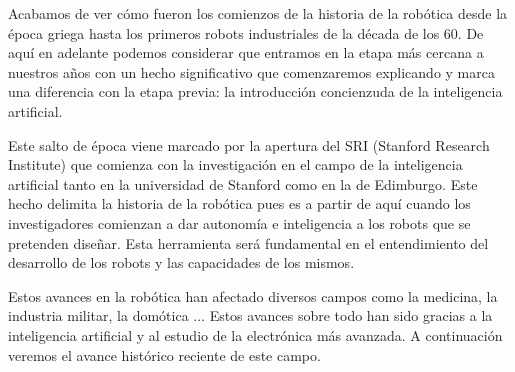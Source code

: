 Acabamos de ver cómo fueron los comienzos de la historia de la robótica desde la época griega hasta los primeros robots industriales de la década de los 60. De aquí en adelante podemos considerar que entramos en la etapa más cercana a nuestros años con un hecho significativo que comenzaremos explicando y marca una diferencia con la etapa previa: la introducción concienzuda de la inteligencia artificial.

Este salto de época viene marcado por la apertura del SRI (Stanford Research Institute) que comienza con la investigación en el campo de la inteligencia artificial tanto en la universidad de Stanford como en la de Edimburgo. Este hecho delimita la historia de la robótica pues es a partir de aquí cuando los investigadores comienzan a dar autonomía e inteligencia a los robots que se pretenden diseñar. Esta herramienta será fundamental en el entendimiento del desarrollo de los robots y las capacidades de los mismos.

Estos avances en la robótica han afectado diversos campos como la medicina, la industria militar, la domótica ... Estos avances sobre todo han sido gracias a la inteligencia artificial y al estudio de la electrónica más avanzada. A continuación veremos el avance histórico reciente de este campo.
